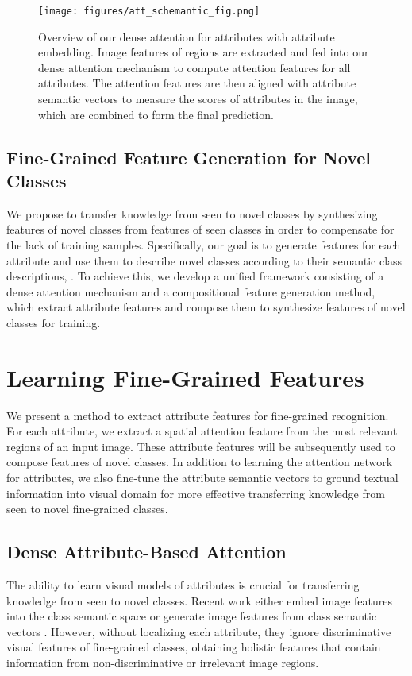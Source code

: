 \documentclass[10pt,journal,compsoc]{IEEEtran}
\newcommand{\1}{\boldsymbol{1}}
\newcommand{\0}{\boldsymbol{0}}
\newcommand{\<}{\langle}
\renewcommand{\>}{\rangle}
\begin{document}
\begin{figure*}[t]
\centering
\texttt{[image: figures/att\_schemantic\_fig.png]}
\vspace{-0mm}
\caption{
\small{
Overview of our dense attention for attributes with attribute embedding. Image features of  regions are extracted and fed into our dense attention mechanism to compute attention features for all attributes. The attention features are then aligned with attribute semantic vectors to measure the scores of attributes in the image, which are combined to form the final prediction.}
}

\label{fig:att_schemantic_fig}
\end{figure*}


\subsection{Fine-Grained Feature Generation for Novel Classes}
We propose to transfer knowledge from seen to novel classes by synthesizing features of novel classes from features of seen classes in order to compensate for the lack of training samples.
Specifically, our goal is to generate features for each attribute and use them to describe novel classes according to their semantic class descriptions, .
To achieve this, we develop a unified framework consisting of a dense attention mechanism and a compositional feature generation method, which extract attribute features and compose them to synthesize features of novel classes for training.

\section{Learning Fine-Grained Features}
\label{sec:fine_grained_features}
We present a method to extract attribute features for fine-grained recognition. For each attribute, we extract a spatial attention feature from the most relevant regions of an input image.
These attribute features will be subsequently used to compose features of novel classes.
In addition to learning the attention network for attributes, we also fine-tune the attribute semantic vectors to ground textual information into visual domain for more effective transferring knowledge from seen to novel fine-grained classes.


\subsection{Dense Attribute-Based Attention}
The ability to learn visual models of attributes is crucial for transferring knowledge from seen to novel classes. Recent work either embed image features into the class semantic space \cite{Changpinyo:CVPR16,Frome:NIPS13,Norouzi:ICLR14,Xian:CVPR16,Zhang:CVPR16} or generate image features from class semantic vectors \cite{Felix:ECCV18,Xian:CVPR19,Schonfeld:CVPR19,Xian:CVPR18}. However, without localizing each attribute, they ignore discriminative visual features of fine-grained classes, obtaining holistic features that contain information from non-discriminative or irrelevant image regions.
\end{document}
